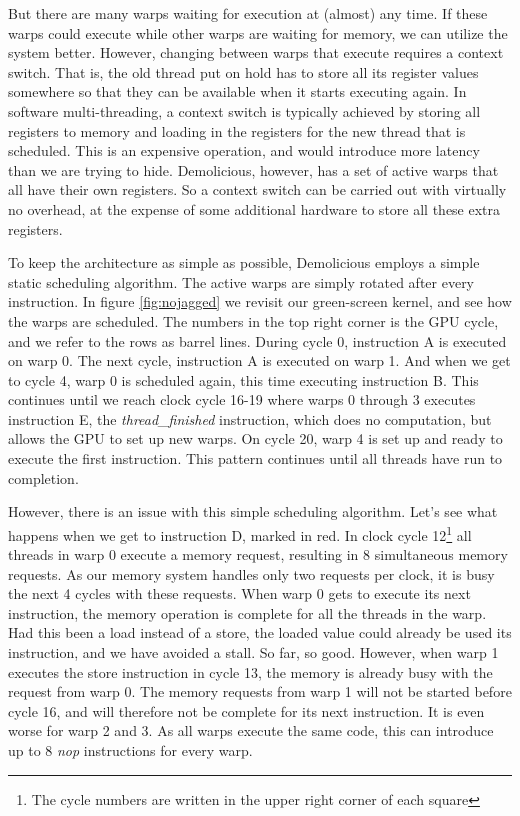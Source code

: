 \documentclass[../main/report.tex]{subfiles}
\begin{document}
But there are many warps waiting for execution at (almost) any time.
If these warps could execute while other warps are waiting for memory, we can utilize the system better.
However, changing between warps that execute requires a context switch.
That is, the old thread put on hold has to store all its register values somewhere so that they can be available when it starts executing again.
In software multi-threading, a context switch is typically achieved by storing all registers to memory and loading in the registers for the new thread that is scheduled.
This is an expensive operation, and would introduce more latency than we are trying to hide.
Demolicious, however, has a set of active warps that all have their own registers.
So a context switch can be carried out with virtually no overhead, at the expense of some additional hardware to store all these extra registers.

To keep the architecture as simple as possible, Demolicious employs a simple static scheduling algorithm.
The active warps are simply rotated after every instruction. In figure \ref{fig:nojagged} we revisit our green-screen kernel, and see how the warps are scheduled.
The numbers in the top right corner is the GPU cycle, and we refer to the rows as barrel lines.
During cycle 0, instruction A is executed on warp 0.
The next cycle, instruction A is executed on warp 1.
And when we get to cycle 4, warp 0 is scheduled again, this time executing instruction B.
This continues until we reach clock cycle 16-19 where warps 0 through 3 executes instruction E, the \emph{thread\_finished} instruction, which does no computation, but allows the GPU to set up new warps.
On cycle 20, warp 4 is set up and ready to execute the first instruction.
This pattern continues until all threads have run to completion.

However, there is an issue with this simple scheduling algorithm.
Let's see what happens when we get to instruction D, marked in red.
In clock cycle 12\footnote{The cycle numbers are written in the upper right corner of each square} all threads in warp 0 execute a memory request, resulting in 8 simultaneous memory requests.
As our memory system handles only two requests per clock,
it is busy the next 4 cycles with these requests.
When warp 0 gets to execute its next instruction, the memory operation is complete for all the threads in the warp.
Had this been a load instead of a store, the loaded value could already be used its instruction, and we have avoided a stall.
So far, so good.
However, when warp 1 executes the store instruction in cycle 13, the memory is already busy with the request from warp 0.
The memory requests from warp 1 will not be started before cycle 16, and will therefore not be complete for its next instruction.
It is even worse for warp 2 and 3. As all warps execute the same code, this can introduce up to 8 \emph{nop} instructions for every warp.
\end{document}
